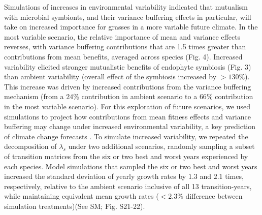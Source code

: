 \documentclass[12pt]{article}
\begin{document}
Simulations of increases in environmental variability indicated that mutualism with microbial symbionts, and their variance buffering effects in particular, will take on increased importance for grasses in a more variable future climate.
In the most variable scenario, the relative importance of mean and variance effects reverses, with variance buffering contributions that are 1.5 times greater than contributions from mean benefits, averaged across species (Fig. 4). 
Increased variability elicited stronger mutualistic benefits of endophyte symbiosis (Fig. 3) than ambient variability (overall effect of the symbiosis increased by $>130 $\%).
This increase was driven by increased contributions from the variance buffering mechanism (from a $24$\% contribution in ambient scenario to a $66$\% contribution in the most variable scenario). 
For this exploration of future scenarios, we used simulations to project how contributions from mean fitness effects and variance buffering may change under increased environmental variability, a key prediction of climate change forecasts \cite{ipcc_2021}.
To simulate increased variability, we repeated the decomposition of $\lambda_s$ under two additional scenarios, randomly sampling a subset of transition matrices from the six or two best and worst years experienced by each species. 
Model simulations that sampled the six or two best and worst years increased the standard deviation of yearly growth rates by $1.3$ and $2.1$ times, respectively, relative to the ambient scenario inclusive of all 13 transition-years, while maintaining equivalent mean growth rates ($<2.3$\% difference between simulation treatments)(See SM; Fig. S21-22).
\end{document}
